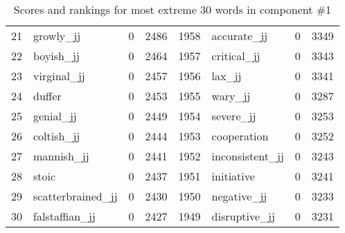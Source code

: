 \begin{table}[tbp]
\begin{tabular}{| rlr@{.}l | rlr@{.}l |}
    21 & growly\_jj & 0 & 2486    &    1958 & accurate\_jj & 0 & 3349 \\
    22 & boyish\_jj & 0 & 2464    &    1957 & critical\_jj & 0 & 3343 \\
    23 & virginal\_jj & 0 & 2457    &    1956 & lax\_jj & 0 & 3341 \\
    24 & duffer & 0 & 2453    &    1955 & wary\_jj & 0 & 3287 \\
    25 & genial\_jj & 0 & 2449    &    1954 & severe\_jj & 0 & 3253 \\
    26 & coltish\_jj & 0 & 2444    &    1953 & cooperation & 0 & 3252 \\
    27 & mannish\_jj & 0 & 2441    &    1952 & inconsistent\_jj & 0 & 3243 \\
    28 & stoic & 0 & 2437    &    1951 & initiative & 0 & 3241 \\
    29 & scatterbrained\_jj & 0 & 2430    &    1950 & negative\_jj & 0 & 3233 \\
    30 & falstaffian\_jj & 0 & 2427    &    1949 & disruptive\_jj & 0 & 3231 \\
    \hline
    \end{tabular}
    \caption{Scores and rankings for most extreme 30 words in component \#1} 
\end{table}
\clearpage
